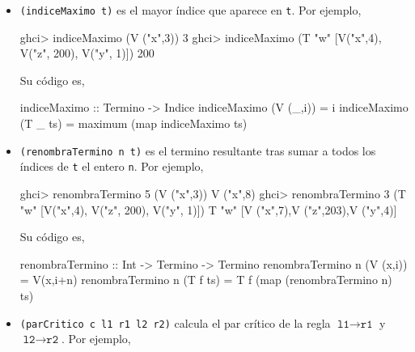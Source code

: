 \begin{itemize}
\item \texttt{(indiceMaximo t)} es el mayor índice que aparece en
  \texttt{t}. Por ejemplo,
\begin{sesion}
ghci> indiceMaximo (V ("x",3))
3
ghci> indiceMaximo (T "w" [V("x",4), V("z", 200), V("y", 1)])
200
\end{sesion}

Su código es,

\begin{code}
indiceMaximo :: Termino -> Indice
indiceMaximo (V (_,i)) = i
indiceMaximo (T _ ts) = maximum (map indiceMaximo ts)
\end{code}

\item \texttt{(renombraTermino n t)} es el termino resultante tras sumar a
  todos los índices de \texttt{t} el entero \texttt{n}. Por ejemplo,
\begin{sesion}
ghci> renombraTermino 5 (V ("x",3)) 
V ("x",8)
ghci> renombraTermino 3 (T "w" [V("x",4), V("z", 200), V("y", 1)])
T "w" [V ("x",7),V ("z",203),V ("y",4)]
\end{sesion}

Su código es,

\begin{codigo}
renombraTermino :: Int -> Termino -> Termino
renombraTermino n (V (x,i)) = V(x,i+n)
renombraTermino n (T f ts) = T f (map (renombraTermino n) ts)
\end{codigo}

\item \texttt{(parCritico c l1 r1 l2 r2)} calcula el par crítico de la
  regla $\texttt{l1} \rightarrow \texttt{r1}$ y
  $\texttt{l2} \rightarrow \texttt{r2}$. Por ejemplo,

\end{itemize}
    



\clearpage
\addappheadtotoc
\appendix


